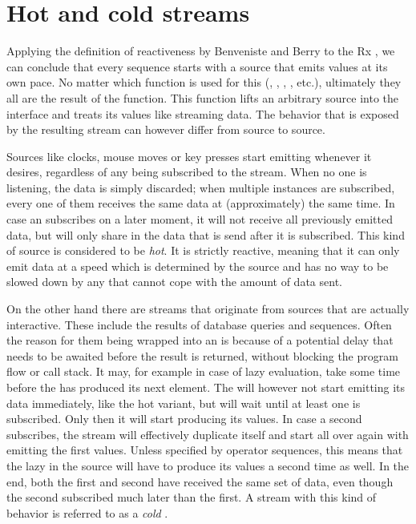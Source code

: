 \section{Hot and cold streams}
Applying the definition of reactiveness by Benveniste and Berry \cite{berry1991-Reactive} to the Rx \obs, we can conclude that every \obs sequence starts with a source that emits values at its own pace. No matter which function is used for this (, , , , etc.), ultimately they all are the result of the  function. This function lifts an arbitrary source into the \obs interface and treats its values like streaming data. The behavior that is exposed by the resulting stream can however differ from source to source.

Sources like clocks, mouse moves or key presses start emitting whenever it desires, regardless of any \obv being subscribed to the stream. When no one is listening, the data is simply discarded; when multiple \obv instances are subscribed, every one of them receives the same data at (approximately) the same time. In case an \obv subscribes on a later moment, it will not receive all previously emitted data, but will only share in the data that is send after it is subscribed. This kind of source is considered to be \textit{hot}. It is strictly reactive, meaning that it can only emit data at a speed which is determined by the source and has no way to be slowed down by any \obv that cannot cope with the amount of data sent.

On the other hand there are streams that originate from sources that are actually interactive. These include the results of database queries and \ieb sequences. Often the reason for them being wrapped into an \obs is because of a potential delay that needs to be awaited before the result is returned, without blocking the program flow or call stack. It may, for example in case of lazy evaluation, take some time before the \ier has produced its next element. The \obs will however not start emitting its data immediately, like the hot variant, but will wait until at least one \obv is subscribed. Only then it will start producing its values. In case a second \obv subscribes, the stream will effectively duplicate itself and start all over again with emitting the first values. Unless specified by operator sequences, this means that the lazy \ier in the source will have to produce its values a second time as well. In the end, both the first and second \obv have received the same set of data, even though the second subscribed much later than the first. A stream with this kind of behavior is referred to as a \textit{cold} \obs.

